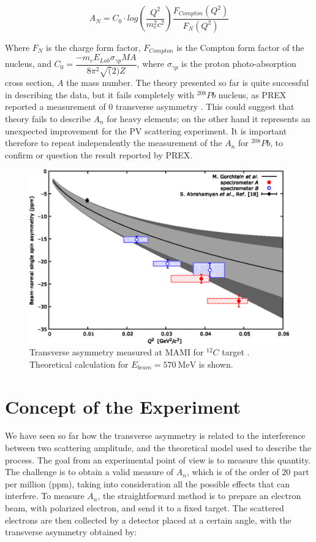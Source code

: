 \begin{equation}
A_{N} = C_{0} \cdot log(\dfrac{Q^{2}}{m_{e}^{2} c^{2}}) \dfrac{F_{Compton}(Q^{2})}{F_{N}(Q^{2})}
\end{equation}

Where $F_{N}$ is the charge form factor, $F_{Compton}$ is the Compton form factor of the nucleus, and $C_{0} = \dfrac{- m_{e} E_{Lab} \sigma_{\gamma p} M A}{8 \pi^{2} \sqrt(2) Z}$, where $\sigma_{\gamma p}$ is the proton photo-absorption cross section, $A$ the mass number. 
The theory presented so far is quite successful in describing the data, but it fails completely with $^{208}Pb$ nucleus, as PREX reported a measurement of $0$ transverse asymmetry \cite{HAPPEX:2012fud}. This could suggest that theory fails to describe $A_{n}$ for heavy elements; on the other hand it represents an unexpected improvement for the PV scattering experiment. It is important therefore to repeat independently the measurement of the $A_{n}$ for $^{208}Pb$, to confirm or question the result reported by PREX.

\begin{figure}[hbtp]
\centering
\includegraphics[scale = 0.5]{Transverse/medium.png}
\caption{Transverse asymmetry measured at MAMI for $^{12}C$ target \cite{Esser:2018vdp}. Theoretical calculation for $E_{beam} = \SI{570}{\mega \electronvolt}$  is shown.}
\end{figure}

\section{Concept of the Experiment}

We have seen so far how the transverse asymmetry is related to the interference between two scattering amplitude, and the theoretical model used to describe the process. The goal from an experimental point of view is to measure this quantity. The challenge is to obtain a valid measure of $A_{n}$, which is of the order of $20$ part per million (ppm), taking into consideration all the possible effects that can interfere. To measure $A_{n}$, the straightforward method is to prepare an electron beam, with polarized electron, and send it to a fixed target. The scattered electrons are then collected by a detector placed at a certain angle, with the transverse asymmetry obtained by:

